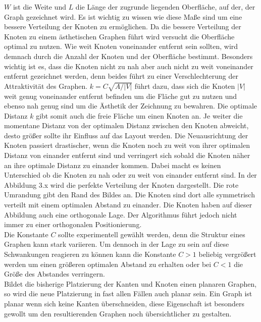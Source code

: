 $W$ ist die Weite und $L$ die Länge der zugrunde liegenden Oberfläche, auf der, der Graph gezeichnet wird. Es ist wichtig zu wissen wie diese Maße sind um eine bessere Verteilung der Knoten zu ermöglichen. Da die bessere Verteilung der Knoten zu einem ästhetischen Graphen führt wird versucht die Oberfläche optimal zu nutzen. Wie weit Knoten voneinander entfernt sein sollten, wird demnach durch die Anzahl der Knoten und der Oberfläche bestimmt. Besonders wichtig ist es, dass die Knoten nicht zu nah aber auch nicht zu weit voneinander entfernt gezeichnet werden, denn beides führt zu einer Verschlechterung der Attraktivität des Graphen. $k = C\sqrt{A / |V|}$ führt dazu, dass sich die Knoten $|V|$ weit genug voneinander entfernt befinden um die Fläche gut zu nutzen und ebenso nah genug sind um die Ästhetik der Zeichnung zu bewahren. Die optimale Distanz $k$ gibt somit auch die freie Fläche um einen Knoten an. Je weiter die momentane Distanz von der optimalen Distanz zwischen den Knoten abweicht, desto größer sollte ihr Einfluss auf das Layout werden. Die Neuausrichtung der Knoten passiert drastischer, wenn die Knoten noch zu weit von ihrer optimalen Distanz von einander entfernt sind und verringert sich sobald die Knoten näher an ihre optimale Distanz zu einander kommen. Dabei macht es keinen Unterschied ob die Knoten zu nah oder zu weit von einander entfernt sind. In der Abbildung 3.x wird die perfekte Verteilung der Knoten dargestellt. Die rote Umrandung gibt den Rand des Bildes an. Die Knoten sind dort alle symmetrisch verteilt mit einem optimalen Abstand zu einander. Die Knoten haben auf dieser Abbildung auch eine orthogonale Lage. Der Algorithmus führt jedoch nicht immer zu einer orthogonalen Positionierung.  \\
 
Die Konstante $C$ sollte experimentell gewählt werden, denn die Struktur eines Graphen kann stark variieren. Um dennoch in der Lage zu sein auf diese Schwankungen reagieren zu können kann die Konstante $C > 1$ beliebig vergrößert werden um einen größeren optimalen Abstand zu erhalten oder bei $C < 1$ die Größe des Abstandes verringern. \\

Bildet die bisherige Platzierung der Kanten und Knoten einen planaren Graphen, so wird die neue Platzierung in fast allen Fällen auch planar sein. Ein Graph ist planar wenn sich keine Kanten überschneiden, diese Eigenschaft ist besonders gewollt um den resultierenden Graphen noch übersichtlicher zu gestalten. \\


